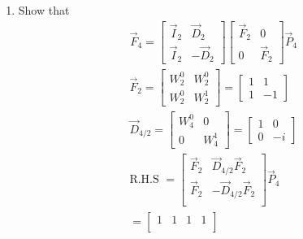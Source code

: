 \documentclass[journal,12pt,twocolumn]{IEEEtran}
\renewcommand\thesection{\arabic{section}}
\begin{document}
\begin{enumerate}[label=\arabic*.,ref=\thesection.\theenumi]
	\item Show that 
	\begin{align}
		\vec{F}_{4}=
		\begin{bmatrix}
			\vec{I}_{2} & \vec{D}_{2} \\
			\vec{I}_{2} & -\vec{D}_{2}
		\end{bmatrix}
		\begin{bmatrix}
			\vec{F}_{2} & 0 \\
			0 & \vec{F}_{2}
		\end{bmatrix}
		\vec{P}_{4}
	\end{align}
	\solution
	\begin{align}
		\vec{F}_{2} = 
		\begin{bmatrix}
			W_{2}^0	&	W_{2}^0\\
			W_{2}^0	&	W_{2}^1
		\end{bmatrix}
		=		\begin{bmatrix}
			1	&	1\\
			1	&	-1
		\end{bmatrix}\\
		\vec{D}_{4/2} =
		\begin{bmatrix}
			W_4^0 &	0\\
			0	&	W_4^1 
		\end{bmatrix}
		=\begin{bmatrix}
			1	&	0\\
			0	&	-i 
		\end{bmatrix}\\
		\text{R.H.S } = 
		\begin{bmatrix}
			\vec{F}_{2} & \vec{D}_{4/2} \vec{F}_{2}\\
			\vec{F}_{2} & -\vec{D}_{4/2} \vec{F}_{2}\\
		\end{bmatrix}\vec{P}_{4}\\
		=\begin{bmatrix}
			1	&	1	&	1	&	1\\

\end{bmatrix}
\end{align}
\end{enumerate}
\end{document}
